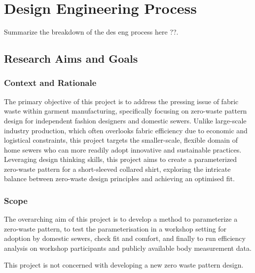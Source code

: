 \chapter{Design Engineering Process} 
Summarize the breakdown of the des eng process here ??.

\section{Research Aims and Goals}

\subsection{Context and Rationale}
The primary objective of this project is to address the pressing issue of fabric waste within garment manufacturing, specifically focusing on zero-waste pattern design for independent fashion designers and domestic sewers. Unlike large-scale industry production, which often overlooks fabric efficiency due to economic and logistical constraints, this project targets the smaller-scale, flexible domain of home sewers who can more readily adopt innovative and sustainable practices. Leveraging design thinking skills, this project aims to create a parameterized zero-waste pattern for a short-sleeved collared shirt, exploring the intricate balance between zero-waste design principles and achieving an optimised fit.

\subsection{Scope}
The overarching aim of this project is to develop a method to parameterize a zero-waste pattern, to test the parameterisation in a workshop setting for adoption by domestic sewers, check fit and comfort, and finally to run efficiency analysis on workshop participants and publicly available body measurement data.

This project is not concerned with developing a new zero waste pattern design.

